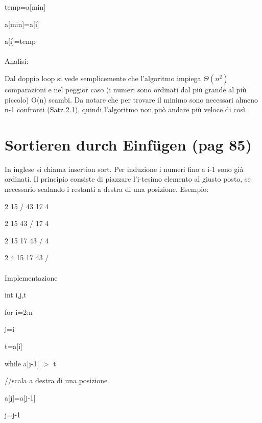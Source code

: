 \documentclass[12pt,a4paper]{book}
\begin{document}
\hspace{2em} temp=a[min]

\hspace{2em} a[min]=a[i]

\hspace{2em} a[i]=temp

\paragraph{}
Analisi:

Dal doppio loop si vede semplicemente che l'algoritmo impiega $\Theta (n^2)$ comparazioni e nel peggior caso (i numeri sono ordinati dal più grande al più piccolo) O(n) scambi. Da notare che per trovare il minimo sono necessari almeno n-1 confronti (Satz 2.1), quindi l'algoritmo non può andare più veloce di così. 
\section{Sortieren durch Einfügen (pag 85)}
In inglese si chiama insertion sort. Per induzione i numeri fino a i-1 sono già ordinati. Il principio consiste di piazzare l'i-tesimo elemento al giusto posto, se necessario scalando i restanti a destra di una posizione. Esempio:

2 15 / 43 17 4

2 15 43 / 17 4

2 15 17 43 / 4

2 4 15 17 43 /

\paragraph{}Implementazione

int i,j,t

for i=2:n

\hspace{2em} j=i

\hspace{2em} t=a[i]

\hspace{2em} while a[j-1] $>$ t

\hspace{2em} \hspace{2em} //scala a destra di una posizione

\hspace{2em} \hspace{2em} a[j]=a[j-1]

\hspace{2em} \hspace{2em} j=j-1
\end{document}
